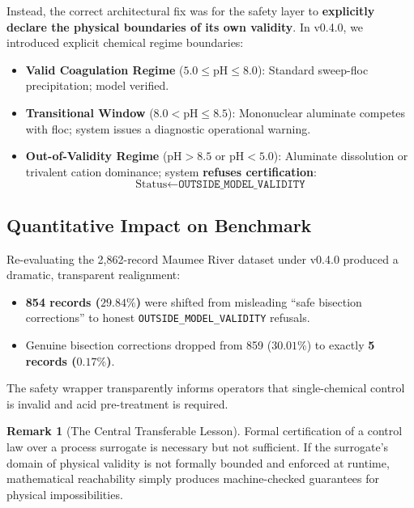 \documentclass[10pt,twocolumn,letterpaper]{article}
\theoremstyle{definition}
\newtheorem{remark}{Remark}
\begin{document}
Instead, the correct architectural fix was for the safety layer to \textbf{explicitly declare the physical boundaries of its own validity}. In v0.4.0, we introduced explicit chemical regime boundaries:
\begin{itemize}
    \item \textbf{Valid Coagulation Regime} ($5.0 \le \text{pH} \le 8.0$): Standard sweep-floc precipitation; model verified.
    \item \textbf{Transitional Window} ($8.0 < \text{pH} \le 8.5$): Mononuclear aluminate competes with floc; system issues a diagnostic operational warning.
    \item \textbf{Out-of-Validity Regime} ($\text{pH} > 8.5$ or $\text{pH} < 5.0$): Aluminate dissolution or trivalent cation dominance; system \textbf{refuses certification}:
    \begin{equation}
    \text{Status} \gets \texttt{OUTSIDE\_MODEL\_VALIDITY}
    \end{equation}
\end{itemize}

\subsection{Quantitative Impact on Benchmark}
Re-evaluating the 2,862-record Maumee River dataset under v0.4.0 produced a dramatic, transparent realignment:
\begin{itemize}
    \item \textbf{854 records ($29.84\%$)} were shifted from misleading ``safe bisection corrections'' to honest \texttt{OUTSIDE\_MODEL\_VALIDITY} refusals.
    \item Genuine bisection corrections dropped from 859 ($30.01\%$) to exactly \textbf{5 records ($0.17\%$)}.
\end{itemize}
The safety wrapper transparently informs operators that single-chemical control is invalid and acid pre-treatment is required.

\begin{remark}[The Central Transferable Lesson]
Formal certification of a control law over a process surrogate is necessary but not sufficient. If the surrogate's domain of physical validity is not formally bounded and enforced at runtime, mathematical reachability simply produces machine-checked guarantees for physical impossibilities.
\end{remark}
\end{document}
